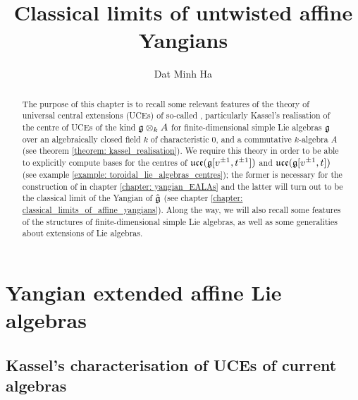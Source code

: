 

\setcounter{chapter}{-1}
\setcounter{section}{-1}


\newcommand{\toroidal}{\t}
\newcommand{\extendedtoroidal}{\hat{\t}}
\newcommand{\simpleroots}{\mathbb{I}}
\renewcommand{\positive}{+} 
\renewcommand{\negative}{-}



    \title{Classical limits of untwisted affine Yangians}
    
    \author{Dat Minh Ha}
    \maketitle
    
    {
      \hypersetup{} 
      \dominitoc
      \tableofcontents %
    }

    \newpage

    \listoftodos

    \newpage

    

    \newpage

    \part{Yangian extended affine Lie algebras}
        \chapter{Kassel's characterisation of UCEs of current algebras}
            \begin{abstract}
                The purpose of this chapter is to recall some relevant features of the theory of universal central extensions (UCEs) of so-called , particularly Kassel's realisation of the centre of UCEs of the kind $\g \tensor_k A$ for finite-dimensional simple Lie algebras $\mathfrak{g}$ over an algebraically closed field $k$ of characteristic $0$, and a commutative $k$-algebra $A$ (see theorem \ref{theorem: kassel_realisation}). We require this theory in order to be able to explicitly compute bases for the centres of $\mathfrak{uce}(\mathfrak{g}[v^{\pm 1}, t^{\pm 1}])$ and $\mathfrak{uce}(\mathfrak{g}[v^{\pm 1}, t])$ (see example \ref{example: toroidal_lie_algebras_centres}); the former is necessary for the construction of  in chapter \ref{chapter: yangian_EALAs} and the latter will turn out to be the classical limit of the Yangian of $\hat{\mathfrak{g}}$ (see chapter \ref{chapter: classical_limits_of_affine_yangians}). Along the way, we will also recall some features of the structures of finite-dimensional simple Lie algebras, as well as some generalities about extensions of Lie algebras.
            \end{abstract}
    
